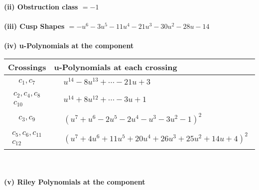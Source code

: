 \documentclass[1p]{elsarticle_modified}
\theoremstyle{definition}
\begin{document}
\flushleft \textbf{(ii) Obstruction class $= -1$}\\~\\
\flushleft \textbf{(iii) Cusp Shapes $= - u^6-3 u^5-11 u^4-21 u^3-30 u^2-28 u-14$}\\~\\
\newpage\renewcommand{\arraystretch}{1}
\flushleft \textbf{(iv) u-Polynomials at the component}\newline \\
\begin{tabular}{m{50pt}|m{274pt}}
Crossings & \hspace{64pt}u-Polynomials at each crossing \\
\hline $$\begin{aligned}c_{1},c_{7}\end{aligned}$$&$\begin{aligned}
&u^{14}-8 u^{13}+\cdots-21 u+3
\end{aligned}$\\
\hline $$\begin{aligned}c_{2},c_{4},c_{8}\\c_{10}\end{aligned}$$&$\begin{aligned}
&u^{14}+8 u^{12}+\cdots-3 u+1
\end{aligned}$\\
\hline $$\begin{aligned}c_{3},c_{9}\end{aligned}$$&$\begin{aligned}
&(u^7+u^6-2 u^5-2 u^4- u^3-3 u^2-1)^2
\end{aligned}$\\
\hline $$\begin{aligned}c_{5},c_{6},c_{11}\\c_{12}\end{aligned}$$&$\begin{aligned}
&(u^7+4 u^6+11 u^5+20 u^4+26 u^3+25 u^2+14 u+4)^2
\end{aligned}$\\
\hline
\end{tabular}\\~\\
\newpage\renewcommand{\arraystretch}{1}
\flushleft \textbf{(v) Riley Polynomials at the component}\newline \\
\end{document}
